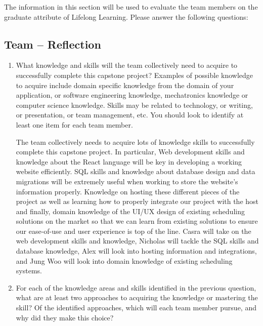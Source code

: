 \documentclass[12pt]{article}
\begin{document}
The information in this section will be used to evaluate the team members on the
graduate attribute of Lifelong Learning.  Please answer the following questions:

\subsection*{Team -- Reflection}

\begin{enumerate}
  \item What knowledge and skills will the team collectively need to acquire to
  successfully complete this capstone project?  Examples of possible knowledge
  to acquire include domain specific knowledge from the domain of your
  application, or software engineering knowledge, mechatronics knowledge or
  computer science knowledge.  Skills may be related to technology, or writing,
  or presentation, or team management, etc.  You should look to identify at
  least one item for each team member.

  The team collectively needs to acquire lots of knowledge skills to successfully 
  complete this capstone project. In particular, Web development skills and knowledge 
  about the React language  will be key in developing a working website efficiently. SQL 
  skills and knowledge about database design and data migrations will be extremely useful 
  when working to store the website’s information properly. Knowledge on hosting these 
  different pieces of the project as well as learning how to properly integrate our project 
  with the host and finally, domain knowledge of the UI/UX design of existing scheduling 
  solutions on the market so that we can learn from existing solutions to ensure our 
  ease-of-use and user experience is top of the line. Casra will take on the web development 
  skills and knowledge, Nicholas will tackle the SQL skills and database knowledge, 
  Alex will look into hosting information and integrations, and Jung Woo will look into 
  domain knowledge of existing scheduling systems.

  \item For each of the knowledge areas and skills identified in the previous
  question, what are at least two approaches to acquiring the knowledge or
  mastering the skill?  Of the identified approaches, which will each team
  member pursue, and why did they make this choice?


\end{enumerate}
\end{document}
